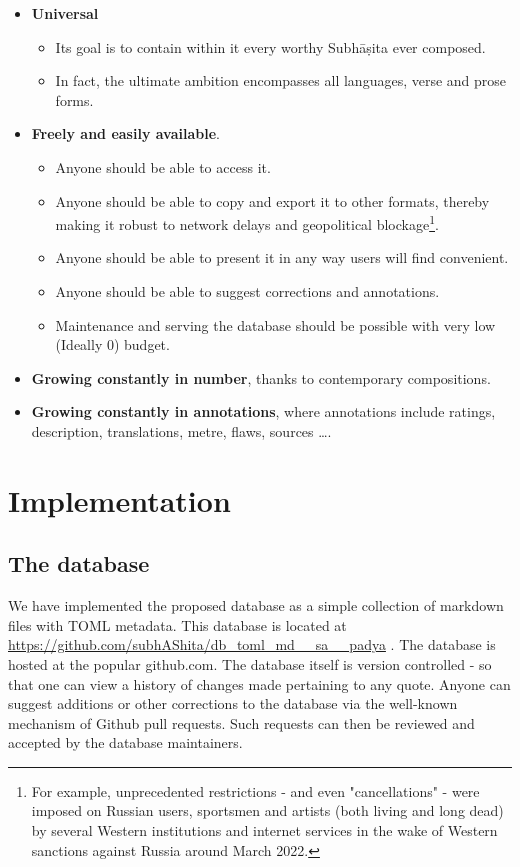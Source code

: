 \documentclass[11pt]{article}
\begin{document}
\begin{itemize}
\tightlist
\item
  \textbf{Universal}

  \begin{itemize}
  \tightlist
  \item
    Its goal is to contain within it every worthy Subhāṣita ever
    composed.
  \item
    In fact, the ultimate ambition encompasses all languages, verse
    and prose forms.
  \end{itemize}

\item
  \textbf{Freely and easily available}.

  \begin{itemize}
  \tightlist
  \item
     Anyone should be able to access it.
  \item
     Anyone should be able to copy and export it to other formats, thereby making it robust to network delays and geopolitical blockage\footnote{For example, unprecedented restrictions - and even "cancellations" - were imposed on Russian users, sportsmen and artists (both living and long dead) by several Western institutions and internet services in the wake of Western sanctions against Russia around March 2022.}. 
  \item
     Anyone should be able to present it in any way users will find convenient.
  \item
     Anyone should be able to suggest corrections and annotations. 
  \item
     Maintenance and serving the database should be possible with very low (Ideally 0) budget. 
  \end{itemize}
\item
  \textbf{Growing constantly in number}, thanks to contemporary compositions.
\item
  \textbf{Growing constantly in annotations}, where annotations include ratings, description, translations, metre, flaws, sources \ldots.
\end{itemize}

\section{Implementation}
\subsection{The database}
We have implemented the proposed database as a simple collection of markdown files with TOML metadata. This database is located at \url{https://github.com/subhAShita/db_toml_md__sa__padya} . The database is hosted at the popular  github.com. The database itself is version controlled - so that one can view a history of changes made pertaining to any quote. Anyone can suggest additions or other corrections to the database via the well-known mechanism of Github pull requests. Such requests can then be reviewed and accepted by the database maintainers.
\end{document}
